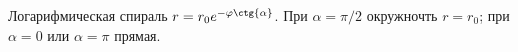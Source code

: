 Логарифмическая спираль $r = r_0e^{-\varphi \ctg{\alpha}}$.
При $\alpha = \pi/2$ окружночть $r = r_0$; при $\alpha = 0$ или $\alpha = \pi$ прямая.
